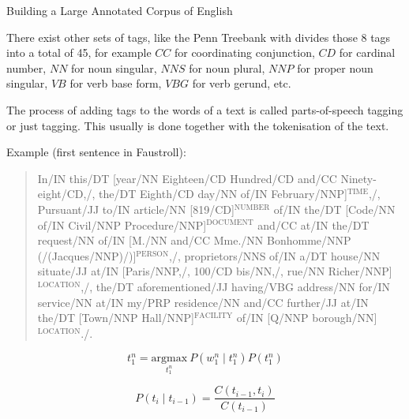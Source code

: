 Building a Large Annotated Corpus of English \autocite{Marcus1993}

There exist other sets of tags, like the Penn Treebank with divides those \num{8} tags into a total of 45, for example $CC$ for coordinating conjunction, $CD$ for cardinal number, $NN$ for noun singular, $NNS$ for noun plural, $NNP$ for proper noun singular, $VB$ for verb base form, $VBG$ for verb gerund, etc.

The process of adding tags to the words of a text is called parts-of-speech tagging or just tagging. This usually is done together with the tokenisation of the text.

Example (first sentence in Faustroll):

\begin{quote}
  In\slash{}IN this\slash{}DT [year\slash{}NN Eighteen\slash{}CD Hundred\slash{}CD and\slash{}CC Ninety-eight\slash{}CD,\slash{}, the\slash{}DT Eighth\slash{}CD day\slash{}NN of\slash{}IN February\slash{}NNP]$^{\text{TIME}}$,\slash{}, Pursuant\slash{}JJ to\slash{}IN article\slash{}NN [819\slash{}CD]$^{\text{NUMBER}}$ of\slash{}IN the\slash{}DT [Code\slash{}NN of\slash{}IN Civil\slash{}NNP Procedure\slash{}NNP]$^{\text{DOCUMENT}}$ and\slash{}CC at\slash{}IN the\slash{}DT request\slash{}NN of\slash{}IN [M.\slash{}NN and\slash{}CC Mme.\slash{}NN Bonhomme\slash{}NNP (\slash{}(Jacques\slash{}NNP)\slash{})]$^{\text{PERSON}}$,\slash{}, proprietors\slash{}NNS of\slash{}IN a\slash{}DT house\slash{}NN situate\slash{}JJ at\slash{}IN [Paris\slash{}NNP,\slash{}, 100\slash{}CD bis\slash{}NN,\slash{}, rue\slash{}NN Richer\slash{}NNP]$^{\text{LOCATION}}$,\slash{}, the\slash{}DT aforementioned\slash{}JJ having\slash{}VBG address\slash{}NN for\slash{}IN service\slash{}NN at\slash{}IN my\slash{}PRP residence\slash{}NN and\slash{}CC further\slash{}JJ at\slash{}IN the\slash{}DT [Town\slash{}NNP Hall\slash{}NNP]$^{\text{FACILITY}}$ of\slash{}IN [Q\slash{}NNP borough\slash{}NN]$^{\text{LOCATION}}$.\slash{}.
\end{quote}

\begin{equation}
  t_1^n = \underset{t_1^n}{\text{argmax}} \ P(w_1^n \mid t_1^n) P(t_1^n)
  \label{eq:tn1}
\end{equation}

\begin{equation}
  P(t_i \mid t_{i-1}) = \frac{C(t_{i-1},t_i)}{C(t_{i-1})}
  \label{eq:pti}
\end{equation}

